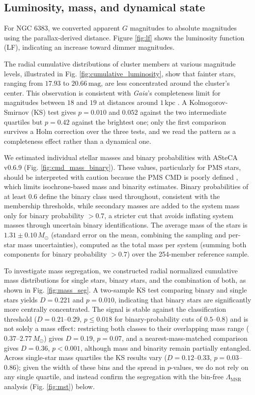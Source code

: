 \documentclass{aa}
\begin{document}
\subsection{Luminosity, mass, and dynamical state}\label{subsec:lum_mass_dyn}

For NGC 6383, we converted apparent $G$ magnitudes to absolute magnitudes using the parallax-derived distance. Figure \ref{fig:lf} shows the luminosity function (LF), indicating an increase toward dimmer magnitudes.

The radial cumulative distributions of cluster members at various magnitude levels, illustrated in Fig. \ref{fig:cumulative_luminosity}, show that fainter stars, ranging from $17.93$ to $20.66\,\mathrm{mag}$, are less concentrated around the cluster's center. This observation is consistent with \textit{Gaia}'s completeness limit for magnitudes between $18$ and $19$ at distances around $1\,\mathrm{kpc}$ \citep{2020MNRAS.497.4246B,2023AA...677A..37C}. A Kolmogorov-Smirnov (KS) test gives $p=0.010$ and $0.052$ against the two intermediate quartiles but $p=0.42$ against the brightest one; only the first comparison survives a Holm correction over the three tests, and we read the pattern as a completeness effect rather than a dynamical one.

We estimated individual stellar masses and binary probabilities with ASteCA v0.6.9 (Fig. \ref{fig:cmd_mass_binary}). These values, particularly for PMS stars, should be interpreted with caution because the PMS CMD is poorly defined \citep{2010ApJ...723..166D}, which limits isochrone-based mass and binarity estimates. Binary probabilities of at least $0.6$ define the binary class used throughout, consistent with the membership thresholds, while secondary masses are added to the system mass only for binary probability $>0.7$, a stricter cut that avoids inflating system masses through uncertain binary identifications. The average mass of the stars is $1.31 \pm 0.10\,M_\odot$ (standard error on the mean, combining the sampling and per-star mass uncertainties), computed as the total mass per system (summing both components for binary probability $>0.7$) over the 254-member reference sample.

To investigate mass segregation, we constructed radial normalized cumulative mass distributions for single stars, binary stars, and the combination of both, as shown in Fig. \ref{fig:mass_seg}. A two-sample KS test comparing binary and single stars yields $D=0.221$ and $p=0.010$, indicating that binary stars are significantly more centrally concentrated. The signal is stable against the classification threshold ($D=0.21$--$0.29$, $p\leq0.018$ for binary-probability cuts of $0.5$--$0.8$) and is not solely a mass effect: restricting both classes to their overlapping mass range ($0.37$--$2.77\,M_\odot$) gives $D=0.19$, $p=0.07$, and a nearest-mass-matched comparison gives $D=0.36$, $p<0.001$, although mass and binarity remain partially entangled. Across single-star mass quartiles the KS results vary ($D=0.12$--$0.33$, $p=0.03$--$0.86$); given the width of these bins and the spread in $p$-values, we do not rely on any single quartile, and instead confirm the segregation with the bin-free $\Lambda_{\mathrm{MSR}}$ analysis (Fig. \ref{fig:mst}) below.
\end{document}
